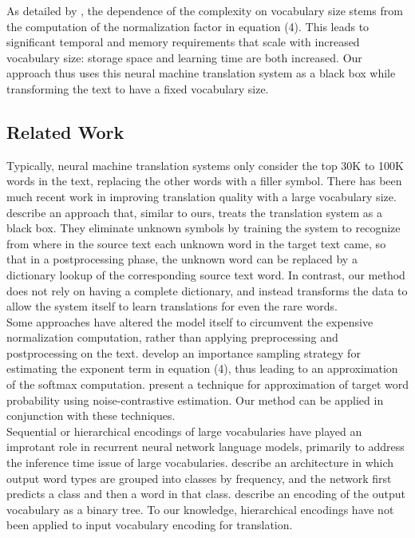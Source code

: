 As detailed by , the dependence of the complexity on vocabulary
size stems from the computation of the normalization factor in equation (4). This leads
to significant temporal and memory requirements that scale with increased vocabulary size: storage space and
learning time are both increased. Our approach thus uses this neural machine
translation system as a black box while transforming the text to have a fixed vocabulary size.

\subsection{Related Work}
Typically, neural machine translation systems only consider the top 30K to 100K words in the text, replacing the other words
with a filler symbol. There has been much recent work in improving translation quality with a large vocabulary size.
 describe an approach
that, similar to ours, treats the translation system as a black box. They eliminate unknown symbols by training the
system to recognize from where in the source text each unknown word in the target text came, so that in a postprocessing
 phase, the unknown word can be replaced by a dictionary lookup of the corresponding source text word. In contrast,
our method does not rely on having a complete dictionary, and instead transforms the data to allow the system itself to
learn translations for even the rare words.\\

Some approaches have altered the model itself to circumvent the expensive normalization computation, rather than
applying preprocessing and postprocessing on the text. 
develop an importance sampling strategy for estimating the exponent term in equation (4), thus leading to
an approximation of the softmax computation. 
present a technique for approximation of target word probability using noise-contrastive estimation. Our method can
be applied in conjunction with these techniques.\\

Sequential or hierarchical encodings of large vocabularies have played an
improtant role in recurrent neural network language models, primarily to
address the inference time issue of large vocabularies. 
describe an architecture in which output word types are grouped into classes by
frequency, and the network first predicts a class and then a word in that
class.  describe an encoding of the output
vocabulary as a binary tree. To our knowledge, hierarchical encodings have not
been applied to input vocabulary encoding for translation.\\

